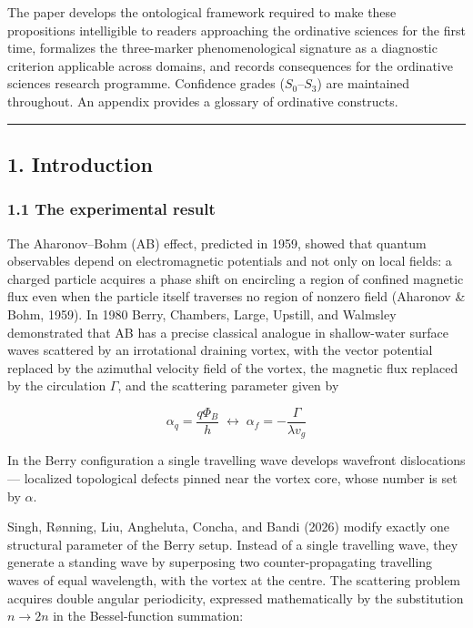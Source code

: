 \documentclass[
  11pt,
  a4paper,
]{article}
\begin{document}
The paper develops the ontological framework required to make these
propositions intelligible to readers approaching the ordinative sciences
for the first time, formalizes the three-marker phenomenological
signature as a diagnostic criterion applicable across domains, and
records consequences for the ordinative sciences research programme.
Confidence grades (\(S_0\)--\(S_3\)) are maintained throughout. An
appendix provides a glossary of ordinative constructs.

\begin{center}\rule{0.5\linewidth}{0.5pt}\end{center}

\subsection{1. Introduction}\label{introduction}

\subsubsection{1.1 The experimental
result}\label{the-experimental-result}

The Aharonov--Bohm (AB) effect, predicted in 1959, showed that quantum
observables depend on electromagnetic potentials and not only on local
fields: a charged particle acquires a phase shift on encircling a region
of confined magnetic flux even when the particle itself traverses no
region of nonzero field (Aharonov \& Bohm, 1959). In 1980 Berry,
Chambers, Large, Upstill, and Walmsley demonstrated that AB has a
precise classical analogue in shallow-water surface waves scattered by
an irrotational draining vortex, with the vector potential replaced by
the azimuthal velocity field of the vortex, the magnetic flux replaced
by the circulation \(\Gamma\), and the scattering parameter given by

\[ \alpha_q = \frac{q\Phi_B}{h} \;\longleftrightarrow\; \alpha_f = -\frac{\Gamma}{\lambda v_g} \tag{1.1} \]

In the Berry configuration a single travelling wave develops wavefront
dislocations --- localized topological defects pinned near the vortex
core, whose number is set by \(\alpha\).

Singh, Rønning, Liu, Angheluta, Concha, and Bandi (2026) modify exactly
one structural parameter of the Berry setup. Instead of a single
travelling wave, they generate a standing wave by superposing two
counter-propagating travelling waves of equal wavelength, with the
vortex at the centre. The scattering problem acquires double angular
periodicity, expressed mathematically by the substitution \(n \to 2n\)
in the Bessel-function summation:
\end{document}
